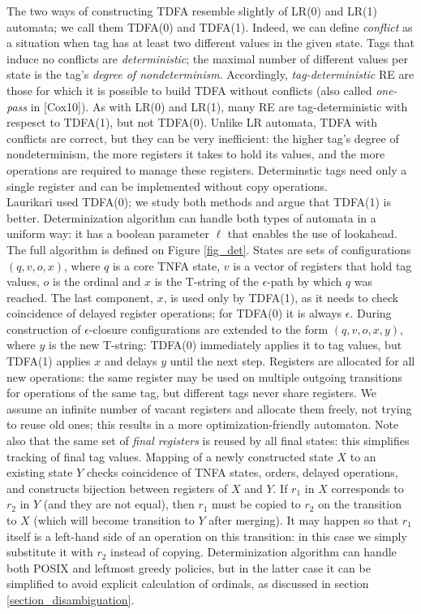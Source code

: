 \documentclass{article}
\theoremstyle{definition}
\begin{document}
\begin{multicols}{2}
The two ways of constructing TDFA resemble slightly of LR(0) and LR(1) automata; we call them TDFA(0) and TDFA(1).
Indeed, we can define \emph{conflict} as a situation when tag has at least two different values in the given state.
Tags that induce no conflicts are \emph{deterministic};
the maximal number of different values per state is the tag's \emph{degree of nondeterminism}.
Accordingly, \emph{tag-deterministic} RE are those for which it is possible to build TDFA without conflicts
(also called \emph{one-pass} in [Cox10]).
As with LR(0) and LR(1), many RE are tag-deterministic with respesct to TDFA(1), but not TDFA(0).
Unlike LR automata, TDFA with conflicts are correct, but they can be very inefficient:
the higher tag's degree of nondeterminism, the more registers it takes to hold its values,
and the more operations are required to manage these registers.
Determinstic tags need only a single register and can be implemented without copy operations.
\\

Laurikari used TDFA(0); we study both methods and argue that TDFA(1) is better.
Determinization algorithm can handle both types of automata in a uniform way:
it has a boolean parameter $\ell$ that enables the use of lookahead.
The full algorithm is defined on Figure \ref{fig_det}.
States are sets of configurations $(q, v, o, x)$,
where $q$ is a core TNFA state, $v$ is a vector of registers that hold tag values, $o$ is the ordinal
and $x$ is the T-string of the $\epsilon$-path by which $q$ was reached.
The last component, $x$, is used only by TDFA(1), as it needs to check coincidence of delayed register operations;
for TDFA(0) it is always $\epsilon$.
During construction of $\epsilon$-closure configurations are extended to the form $(q, v, o, x, y)$,
where $y$ is the new T-string: TDFA(0) immediately applies it to tag values,
but TDFA(1) applies $x$ and delays $y$ until the next step.
Registers are allocated for all new operations:
the same register may be used on multiple outgoing transitions for operations of the same tag,
but different tags never share registers.
We assume an infinite number of vacant registers and allocate them freely, not trying to reuse old ones;
this results in a more optimization-friendly automaton.
Note also that the same set of \emph{final registers} is reused by all final states:
this simplifies tracking of final tag values.
Mapping of a newly constructed state $X$ to an existing state $Y$ checks coincidence of TNFA states, orders, delayed operations,
and constructs bijection between registers of $X$ and $Y$.
If $r_1$ in $X$ corresponds to $r_2$ in $Y$ (and they are not equal), then $r_1$ must be copied to $r_2$ on the transition to $X$
(which will become transition to $Y$ after merging).
It may happen so that $r_1$ itself is a left-hand side of an operation on this transition:
in this case we simply substitute it with $r_2$ instead of copying.
Determinization algorithm can handle both POSIX and leftmost greedy policies,
but in the latter case it can be simplified to avoid explicit calculation of ordinals, as discussed in section \ref{section_disambiguation}.
\\


\end{multicols}
\end{document}
